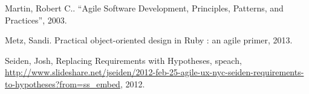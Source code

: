 \documentclass[12pt]{report}
\begin{document}
%
%
\begin{thebibliography}{00}
%
Martin, Robert C.. ``Agile Software Development, Principles, Patterns, and Practices'', 2003.

Metz, Sandi. Practical object-oriented design in Ruby : an agile primer, 2013.

Seiden, Josh, Replacing Requirements with Hypotheses, speach, \url{http://www.slideshare.net/jseiden/2012-feb-25-agile-ux-nyc-seiden-requirements-to-hypotheses?from=ss_embed}, 2012.

\end{thebibliography}
% 
\end{document}
